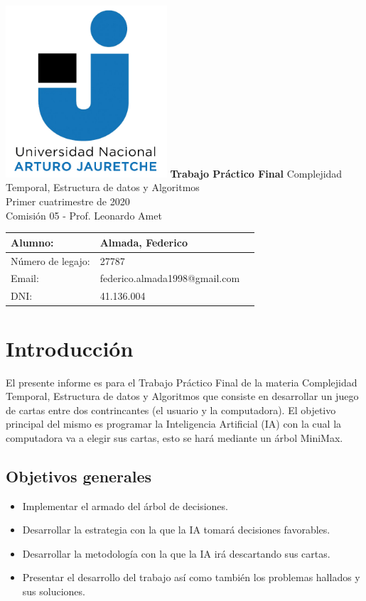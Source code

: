\documentclass[12pt,a4paper]{article}
\author{Federico Almada}
\begin{document}
\begin{titlepage}
	\includegraphics[width=6cm]{unaj.jpg}
    \centering
    \vfill
    \Huge \textbf{Trabajo Práctico Final}
    \vskip2cm
    \Large Complejidad Temporal, Estructura de datos y Algoritmos\\
    Primer cuatrimestre de 2020\\
    Comisión 05 - Prof. Leonardo Amet     
    \vfill
    \begin{tabular}{ | l | l | l}
      \hline
      Alumno: & Almada, Federico \\ \hline
      Número de legajo: & 27787 \\ \hline
      Email: & federico.almada1998@gmail.com \\ \hline
      DNI: & 41.136.004 \\ \hline
  	\end{tabular}
    \vfill
    \vfill
\end{titlepage}
\newpage
\tableofcontents
\newpage

\section{Introducción}
El presente informe es para el Trabajo Práctico Final de la materia Complejidad Temporal, Estructura de datos y Algoritmos que consiste en desarrollar un juego de cartas entre dos contrincantes (el usuario y la computadora). El objetivo principal del mismo es programar la Inteligencia Artificial (IA) con la cual la computadora va a elegir sus cartas, esto se hará mediante un árbol MiniMax.

\subsection{Objetivos generales}
\begin{itemize}
	\item Implementar el armado del árbol de decisiones.
	\item Desarrollar la estrategia con la que la IA tomará decisiones favorables.
	\item Desarrollar la metodología con la que la IA irá descartando sus cartas.
	\item Presentar el desarrollo del trabajo así como también los problemas hallados y sus soluciones.
\end{itemize}
\end{document}
